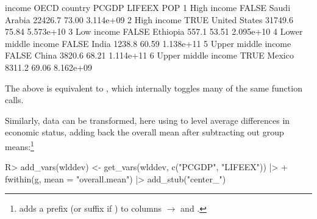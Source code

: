 \documentclass[nojss]{jss} %
\newcommand{\fct}[1]{\code{#1()}}
\begin{document}
%
\begin{Schunk}
\begin{Soutput}
               income  OECD       country   PCGDP LIFEEX       POP
1         High income FALSE  Saudi Arabia 22426.7  73.00 3.114e+09
2         High income  TRUE United States 31749.6  75.84 5.573e+10
3          Low income FALSE      Ethiopia   557.1  53.51 2.095e+10
4 Lower middle income FALSE         India  1238.8  60.59 1.138e+11
5 Upper middle income FALSE         China  3820.6  68.21 1.114e+11
6 Upper middle income  TRUE        Mexico  8311.2  69.06 8.162e+09
\end{Soutput}
\end{Schunk}
The above is equivalent to , which internally toggles many of the same function calls. \newline

%
%
Similarly, data can be transformed, here using \fct{fwithin} to level average differences in economic status, adding back the overall mean after subtracting out group means:\footnote{\fct{add\_stub} adds a prefix (or suffix if ) to columns $\to$  and .}
%
\begin{Schunk}
\begin{Sinput}
R> add_vars(wlddev) <- get_vars(wlddev, c("PCGDP", "LIFEEX")) |>
+      fwithin(g, mean = "overall.mean") |> add_stub("center_")
\end{Sinput}
\end{Schunk}
%
\end{document}
